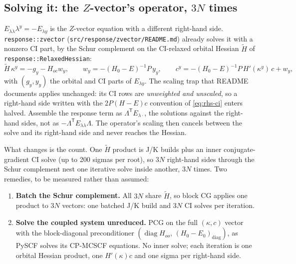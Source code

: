 \documentclass[11pt]{article}
\newcommand{\code}[1]{\texttt{#1}}
\begin{document}
\subsection{Solving it: the \texorpdfstring{$Z$}{Z}-vector's operator, \texorpdfstring{$3N$}{3N} times}
\label{sec:3n}

$E_{\lambda\lambda}\lambda^y = -E_{\lambda y}$ is the $Z$-vector equation
with a different right-hand side. \code{response::zvector}
(\code{src/response/zvector/README.md}) already solves it with a nonzero CI
part, by the Schur complement on the CI-relaxed orbital Hessian $\tilde H$
of \code{response::RelaxedHessian}:
\begin{equation}
  \tilde H\,\kappa^y = -g_y - H_{oc}w_y,
  \qquad w_y = -(H_0 - E)^{-1}P\,y_y,
  \qquad c^y = -(H_0 - E)^{-1}P\,H'(\kappa^y)\,c + w_y,
  \label{eq:schur}
\end{equation}
with $(g_y, y_y)$ the orbital and CI parts of $E_{\lambda y}$. The scaling
trap that README documents applies unchanged: its CI rows are
\emph{unweighted and unscaled}, so a right-hand side written with the
$2P(H-E)c$ convention of \eqref{eq:rhs-ci} enters halved. Assemble the
response term as $\Lambda^{\mathsf T}E_{\lambda\cdot}$, the solutions
against the right-hand sides, not as $-\Lambda^{\mathsf T}E_{\lambda\lambda}
\Lambda$. The operator's scaling then cancels between the solve and its
right-hand side and never reaches the Hessian.

What changes is the count. One $\tilde H$ product is J/K builds plus an
inner conjugate-gradient CI solve (up to 200 sigmas per root), so $3N$
right-hand sides through the Schur complement nest one iterative solve
inside another, $3N$ times. Two remedies, to be measured rather than
assumed:
\begin{enumerate}
  \item \textbf{Batch the Schur complement.} All $3N$ share $\tilde H$, so
        block CG applies one product to $3N$ vectors: one batched J/K
        build and $3N$ CI solves per iteration.
  \item \textbf{Solve the coupled system unreduced.} PCG on the full
        $(\kappa, c)$ vector with the block-diagonal preconditioner
        $(\operatorname{diag}H_{oo},\,(H_0 - E_0)_{\mathrm{diag}})$, as PySCF
        solves its CP-MCSCF equations. No inner solve; each iteration is
        one orbital Hessian product, one $H'(\kappa)c$ and one sigma per
        right-hand side.
\end{enumerate}
\end{document}
